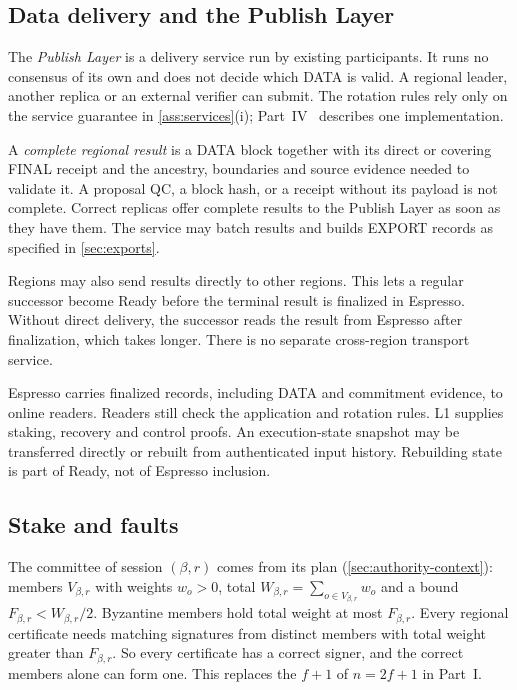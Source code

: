 \documentclass[11pt,a4paper]{article}
\newcommand{\defterm}[1]{\textcolor{rrBlue}{\textit{#1}}}
\begin{document}
\subsection{Data delivery and the Publish Layer}
\label{sec:delivery}
The \defterm{Publish Layer} is a delivery service run by existing
participants. It runs no consensus of its own and does not decide which
DATA is valid. A regional leader, another replica or an external
verifier can submit. The rotation rules rely only on the service
guarantee in \cref{ass:services}(i); Part~IV~\cite{part4}
describes one implementation.

A \defterm{complete regional result} is a DATA block together with its
direct or covering FINAL receipt and the ancestry, boundaries and source
evidence needed to validate it. A proposal QC, a block hash, or a receipt
without its payload is not complete. Correct replicas offer complete
results to the Publish Layer as soon as they have them. The service may
batch results and builds EXPORT records as specified in
\cref{sec:exports}.

Regions may also send results directly to other regions. This lets a
regular successor become Ready before the terminal result is finalized
in Espresso. Without direct delivery, the successor reads the result
from Espresso after finalization, which takes longer. There is no
separate cross-region transport service.

Espresso carries finalized records, including DATA and commitment
evidence, to online readers. Readers still check the application and
rotation rules. L1 supplies staking, recovery and control proofs. An
execution-state snapshot may be transferred directly or rebuilt from
authenticated input history. Rebuilding state is part of Ready,
not of Espresso inclusion.

\subsection{Stake and faults}
\label{sec:stake}
The committee of session $(\beta,r)$ comes from its plan
(\cref{sec:authority-context}): members $V_{\beta,r}$ with weights
$w_o>0$, total $W_{\beta,r}=\sum_{o\in V_{\beta,r}}w_o$ and a bound
$F_{\beta,r}<W_{\beta,r}/2$. Byzantine members hold total weight at most
$F_{\beta,r}$. Every regional certificate needs matching signatures from
distinct members with total weight greater than $F_{\beta,r}$. So every
certificate has a correct signer, and the correct members alone can form
one. This replaces the $f+1$ of $n=2f+1$ in Part~I.
\end{document}
